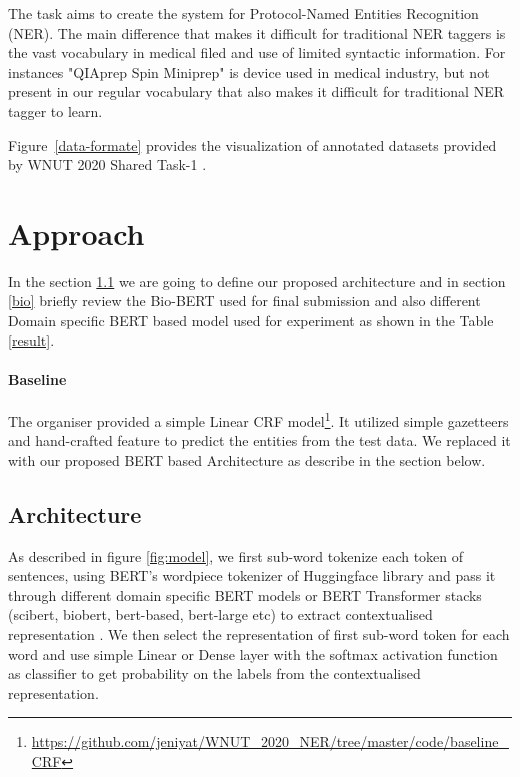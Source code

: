 \documentclass[11pt,a4paper]{article}
\begin{document}
The task aims to create the system for Protocol-Named Entities Recognition (NER). The main difference that makes it difficult for traditional NER taggers is the vast vocabulary in medical filed and use of limited syntactic information. For instances "QIAprep Spin Miniprep" is device used in medical industry, but not present in our regular vocabulary that also makes it difficult for traditional NER tagger to learn.

Figure~\ref{data-formate} provides the visualization of annotated datasets provided by WNUT 2020 Shared Task-1 .


\section{Approach}

In the section \ref{archi} we are going to define our proposed architecture and in section  \ref{bio}  briefly review the Bio-BERT \cite{10.1093/bioinformatics/btz682} used for final submission  and also different Domain specific BERT based model used for experiment as shown in the Table \ref{result}.

\paragraph{Baseline} The organiser provided a simple Linear CRF model\footnote{\url{https://github.com/jeniyat/WNUT_2020_NER/tree/master/code/baseline_CRF}}. It utilized simple gazetteers and hand-crafted feature to predict the entities from the test data. We replaced it with our proposed  BERT based Architecture as describe in the section below.
\subsection{Architecture} \label{archi} As described in figure \ref{fig:model}, we  first sub-word tokenize each token of sentences, using BERT's wordpiece tokenizer of Huggingface library and pass it through different domain specific BERT models or BERT Transformer stacks (scibert, biobert, bert-based, bert-large etc) to extract contextualised representation \citep{Beltagy2019SciBERT,10.1093/bioinformatics/btz682,devlin2018pretraining}. We then select the representation of first sub-word token for each word and use simple Linear or Dense layer with the softmax activation function as classifier to get probability on the labels from the contextualised representation. 
\end{document}
